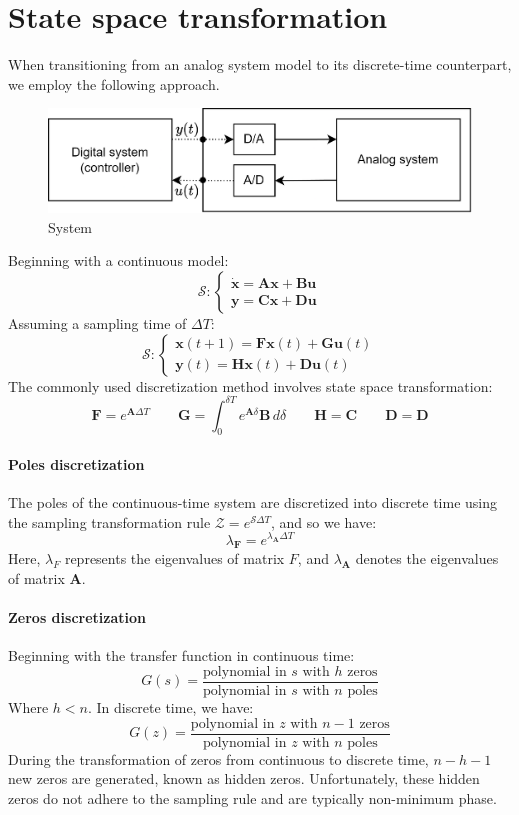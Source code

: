 \section{State space transformation}

When transitioning from an analog system model to its discrete-time counterpart, we employ the following approach. 
\begin{figure}[H]
    \centering
    \includegraphics[width=0.5\linewidth]{images/sys.png}
    \caption{System}
\end{figure}
Beginning with a continuous model:
\[\mathcal{S}:\begin{cases} \dot{\mathbf{x}}=\mathbf{Ax}+\mathbf{Bu} \\ \mathbf{y}=\mathbf{Cx}+\mathbf{Du} \end{cases}\]
Assuming a sampling time of $\Delta T$: 
\[\mathcal{S}:\begin{cases} \mathbf{x}(t+1)=\mathbf{Fx}(t)+\mathbf{Gu}(t) \\ \mathbf{y}(t)=\mathbf{Hx}(t)+\mathbf{Du}(t) \end{cases}\]
The commonly used discretization method involves state space transformation:
\[\mathbf{F}=e^{\mathbf{A}\Delta T} \qquad \mathbf{G}=\int_0^{\delta T}e^{\mathbf{A}\delta}\mathbf{B} \,d\delta\qquad \mathbf{H}=\mathbf{C} \qquad \mathbf{D}=\mathbf{D}\]

\paragraph*{Poles discretization}
The poles of the continuous-time system are discretized into discrete time using the sampling transformation rule $\mathcal{Z}=e^{\mathcal{S}\Delta T}$, and so we have: 
\[\lambda_\mathbf{F}=e^{\lambda_\mathbf{A}\Delta T}\]
Here, $\lambda_F$ represents the eigenvalues of matrix $F$, and $\lambda_\mathbf{A}$ denotes the eigenvalues of matrix $\mathbf{A}$.

\paragraph*{Zeros discretization}
Beginning with the transfer function in continuous time:
\[G(s)=\dfrac{\text{polynomial in }s\text{ with }h \text{ zeros}}{\text{polynomial in }s\text{ with }n \text{ poles}}\]
Where $h<n$. 
In discrete time, we have:
\[G(z)=\dfrac{\text{polynomial in }z\text{ with }n-1 \text{ zeros}}{\text{polynomial in }z\text{ with }n \text{ poles}}\]
During the transformation of zeros from continuous to discrete time, $n-h-1$ new zeros are generated, known as hidden zeros.
Unfortunately, these hidden zeros do not adhere to the sampling rule and are typically non-minimum phase.